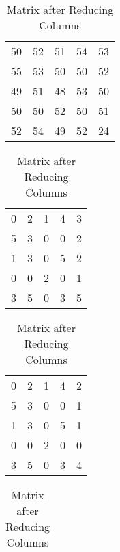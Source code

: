\begin{subquestions}
\begin{subsubquestions}
\begin{table}[!hbt]
	\begin{minipage}{0.3\textwidth}
		\centering
		\begin{tabular}{ccccc}
			50 & 52 & 51 & 54 & 53 \\
		    55 & 53 & 50 & 50 & 52 \\
			49 & 51 & 48 & 53 & 50 \\
			50 & 50 & 52 & 50 & 51 \\
			52 & 54 & 49 & 52 & 24 \\
		\end{tabular}
		\captionsetup{width=1.1\linewidth}
		\caption*{Matrix From question}
	\end{minipage}
	\hspace{20pt}
	\begin{minipage}{0.3\textwidth}
		\centering
		\begin{tabular}{ccccc}
			0 & 2 & 1 & 4 & 3 \\
			5 & 3 & 0 & 0 & 2 \\
			1 & 3 & 0 & 5 & 2 \\
			0 & 0 & 2 & 0 & 1 \\
			3 & 5 & 0 & 3 & 5 \\
		\end{tabular}
		\captionsetup{width=1.1\linewidth}
		\caption*{Matrix after Reducing Rows}
	\end{minipage}
	\hspace{20pt}
	\begin{minipage}{0.3\textwidth}
		\centering
		\begin{tabular}{ccccc}
			0 & 2 & 1 & 4 & 2 \\
			5 & 3 & 0 & 0 & 1 \\
			1 & 3 & 0 & 5 & 1 \\
			0 & 0 & 2 & 0 & 0 \\
			3 & 5 & 0 & 3 & 4 \\
		\end{tabular}
		\captionsetup{width=1.1\linewidth}
		\caption*{Matrix after Reducing Columns} 
	\end{minipage}
	\vspace{20pt} 
	\begin{minipage}{0.3\textwidth}
		\centering
		\begin{tabular} {ccccccc}

\end{tabular}
\end{minipage}
\end{table}
\end{subsubquestions}
\end{subquestions}
